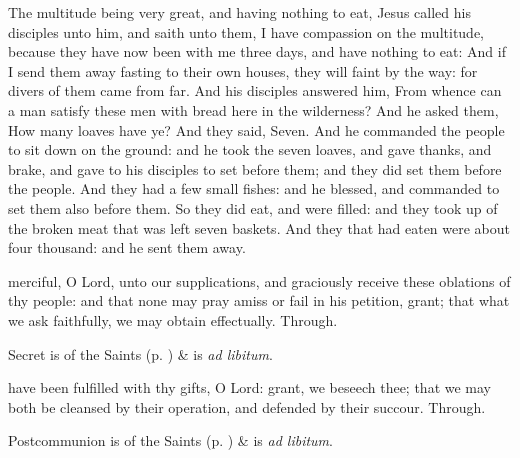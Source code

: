 
 The multitude being very great, and having nothing to eat, Jesus called his disciples unto him, and saith unto them, I have compassion on the multitude, because they have now been with me three days, and have nothing to eat: And if I send them away fasting to their own houses, they will faint by the way: for divers of them came from far. And his disciples answered him, From whence can a man satisfy these men with bread here in the wilderness? And he asked them, How many loaves have ye? And they said, Seven. And he commanded the people to sit down on the ground: and he took the seven loaves, and gave thanks, and brake, and gave to his disciples to set before them; and they did set them before the people. And they had a few small fishes: and he blessed, and commanded to set them also before them. So they did eat, and were filled: and they took up of the broken meat that was left seven baskets. And they that had eaten were about four thousand: and he sent them away.


\secret
{} merciful, O Lord, unto our supplications, and graciously receive these oblations of thy people: and that none may pray amiss or fail in his petition, grant; that what we ask faithfully, we may obtain effectually. Through.
\begin{rubric}
     Secret is of the Saints (p. \pageref{SPSaints}) \&  is \emph{ad libitum}.
\end{rubric}


\postcommunion
{} have been fulfilled with thy gifts, O Lord: grant, we beseech thee; that we may both be cleansed by their operation, and defended by their succour. Through.
\begin{rubric}
     Postcommunion is of the Saints (p. \pageref{SPSaints}) \&  is \emph{ad libitum}.
\end{rubric}


